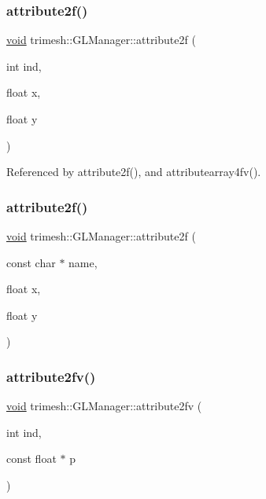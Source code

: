\subsubsection{\texorpdfstring{attribute2f()}{attribute2f()}\hspace{0.1cm}{\footnotesize\ttfamily [1/2]}}
{\footnotesize\ttfamily \hyperlink{namespacetrimesh_a784ddfd979e1c579bda795a8edfc3f43}{void} trimesh\+::\+G\+L\+Manager\+::attribute2f (\begin{DoxyParamCaption}\item[{int}]{ind,  }\item[{float}]{x,  }\item[{float}]{y }\end{DoxyParamCaption})}



Referenced by attribute2f(), and attributearray4fv().

\mbox{\label{classtrimesh_1_1GLManager_a6868734bce865e4b6494549498334396}} 
\subsubsection{\texorpdfstring{attribute2f()}{attribute2f()}\hspace{0.1cm}{\footnotesize\ttfamily [2/2]}}
{\footnotesize\ttfamily \hyperlink{namespacetrimesh_a784ddfd979e1c579bda795a8edfc3f43}{void} trimesh\+::\+G\+L\+Manager\+::attribute2f (\begin{DoxyParamCaption}\item[{const char $\ast$}]{name,  }\item[{float}]{x,  }\item[{float}]{y }\end{DoxyParamCaption})\hspace{0.3cm}{\ttfamily [inline]}}

\mbox{\label{classtrimesh_1_1GLManager_a3bc9e8f43093ca2b28ee402a55953598}} 
\subsubsection{\texorpdfstring{attribute2fv()}{attribute2fv()}\hspace{0.1cm}{\footnotesize\ttfamily [1/2]}}
{\footnotesize\ttfamily \hyperlink{namespacetrimesh_a784ddfd979e1c579bda795a8edfc3f43}{void} trimesh\+::\+G\+L\+Manager\+::attribute2fv (\begin{DoxyParamCaption}\item[{int}]{ind,  }\item[{const float $\ast$}]{p }\end{DoxyParamCaption})\hspace{0.3cm}{\ttfamily [inline]}}



